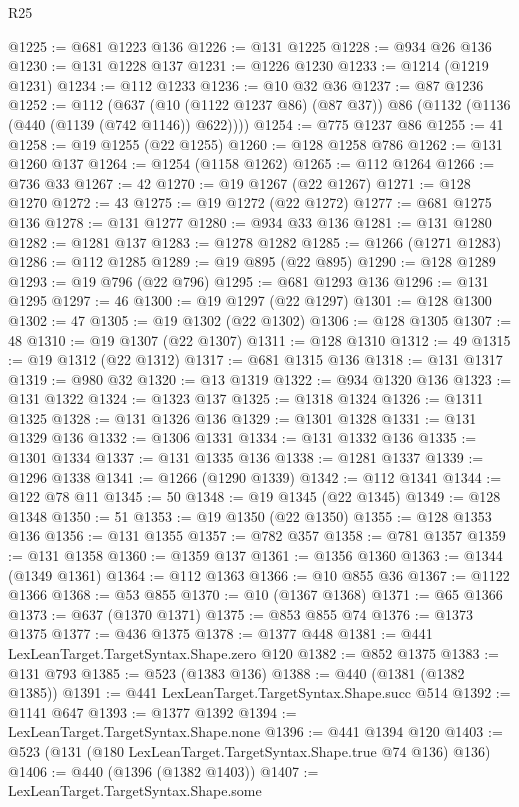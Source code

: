 \begin{lexlean}{R25}
\begin{coremodule}
@1225 := @681 @1223 @136
@1226 := @131 @1225
@1228 := @934 @26 @136
@1230 := @131 @1228 @137
@1231 := @1226 @1230
@1233 := @1214 (@1219 @1231)
@1234 := @112 @1233
@1236 := @10 @32 @36
@1237 := @87 @1236
@1252 := @112
    (@637 (@10 (@1122 @1237 @86) (@87 @37)) @86 (@1132 (@1136 (@440 (@1139 (@742 @1146)) @622))))
@1254 := @775 @1237 @86
@1255 := 41
@1258 := @19 @1255 (@22 @1255)
@1260 := @128 @1258 @786
@1262 := @131 @1260 @137
@1264 := @1254 (@1158 @1262)
@1265 := @112 @1264
@1266 := @736 @33
@1267 := 42
@1270 := @19 @1267 (@22 @1267)
@1271 := @128 @1270
@1272 := 43
@1275 := @19 @1272 (@22 @1272)
@1277 := @681 @1275 @136
@1278 := @131 @1277
@1280 := @934 @33 @136
@1281 := @131 @1280
@1282 := @1281 @137
@1283 := @1278 @1282
@1285 := @1266 (@1271 @1283)
@1286 := @112 @1285
@1289 := @19 @895 (@22 @895)
@1290 := @128 @1289
@1293 := @19 @796 (@22 @796)
@1295 := @681 @1293 @136
@1296 := @131 @1295
@1297 := 46
@1300 := @19 @1297 (@22 @1297)
@1301 := @128 @1300
@1302 := 47
@1305 := @19 @1302 (@22 @1302)
@1306 := @128 @1305
@1307 := 48
@1310 := @19 @1307 (@22 @1307)
@1311 := @128 @1310
@1312 := 49
@1315 := @19 @1312 (@22 @1312)
@1317 := @681 @1315 @136
@1318 := @131 @1317
@1319 := @980 @32
@1320 := @13 @1319
@1322 := @934 @1320 @136
@1323 := @131 @1322
@1324 := @1323 @137
@1325 := @1318 @1324
@1326 := @1311 @1325
@1328 := @131 @1326 @136
@1329 := @1301 @1328
@1331 := @131 @1329 @136
@1332 := @1306 @1331
@1334 := @131 @1332 @136
@1335 := @1301 @1334
@1337 := @131 @1335 @136
@1338 := @1281 @1337
@1339 := @1296 @1338
@1341 := @1266 (@1290 @1339)
@1342 := @112 @1341
@1344 := @122 @78 @11
@1345 := 50
@1348 := @19 @1345 (@22 @1345)
@1349 := @128 @1348
@1350 := 51
@1353 := @19 @1350 (@22 @1350)
@1355 := @128 @1353 @136
@1356 := @131 @1355
@1357 := @782 @357
@1358 := @781 @1357
@1359 := @131 @1358
@1360 := @1359 @137
@1361 := @1356 @1360
@1363 := @1344 (@1349 @1361)
@1364 := @112 @1363
@1366 := @10 @855 @36
@1367 := @1122 @1366
@1368 := @53 @855
@1370 := @10 (@1367 @1368)
@1371 := @65 @1366
@1373 := @637 (@1370 @1371)
@1375 := @853 @855 @74
@1376 := @1373 @1375
@1377 := @436 @1375
@1378 := @1377 @448
@1381 := @441 LexLeanTarget.TargetSyntax.Shape.zero @120
@1382 := @852 @1375
@1383 := @131 @793
@1385 := @523 (@1383 @136)
@1388 := @440 (@1381 (@1382 @1385))
@1391 := @441 LexLeanTarget.TargetSyntax.Shape.succ @514
@1392 := @1141 @647
@1393 := @1377 @1392
@1394 := LexLeanTarget.TargetSyntax.Shape.none
@1396 := @441 @1394 @120
@1403 := @523 (@131 (@180 LexLeanTarget.TargetSyntax.Shape.true @74 @136) @136)
@1406 := @440 (@1396 (@1382 @1403))
@1407 := LexLeanTarget.TargetSyntax.Shape.some

\end{coremodule}
\end{lexlean}
